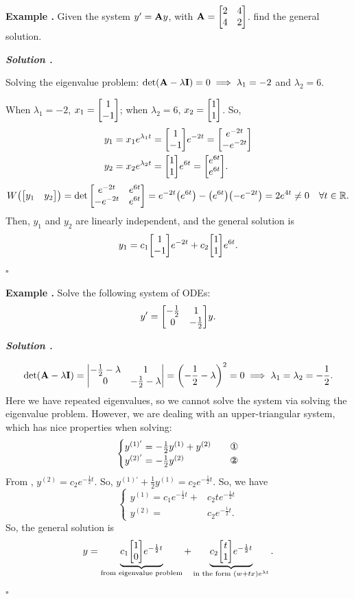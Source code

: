 \documentclass[12pt, a4paper]{article}
\newcounter{index}[subsection]
\newenvironment*{eg}{\begin{framed}\par\noindent\textbf{Example \thesubsection.\stepcounter{index}\theindex}}{\par\end{framed}}
\newcounter{nprf}[subsection]
\newenvironment*{sol}{\par\indent\textbf{\textit{Solution \stepcounter{nprf}\thenprf.}}\par}{\hfill{$\square$}\par}
\def\R{{\mathbb{R}}}
\def\A{\vb A}
\begin{document}
\begin{eg}
	Given the system $y'=\A y$, with $\A=\mqty[2&4\\4&2]$. find the general solution.
	\begin{sol}
		Solving the eigenvalue problem: $\det(\A-\lambda\vb I)=0\implies\lambda_1=-2$ and $\lambda_2=6$.\par When $\lambda_1=-2$, $x_1=\mqty[1\\-1]$; when $\lambda_2=6$, $x_2=\mqty[1\\1]$. So, \begin{align*}y_1&=x_1e^{\lambda_1t}=\mqty[1\\-1]e^{-2t}=\mqty[e^{-2t}\\-e^{-2t}]\\y_2&=x_2e^{\lambda_2t}=\mqty[1\\1]e^{6t}=\mqty[e^{6t}\\e^{6t}].\end{align*} \[W\qty(\mqty[y_1&y_2])=\det\mqty[e^{-2t}&e^{6t}\\-e^{-2t}&e^{6t}]=e^{-2t}\qty(e^{6t})-\qty(e^{6t})\qty(-e^{-2t})=2e^{4t}\neq0\quad\forall t\in\R.\] Then, $y_1$ and $y_2$ are linearly independent, and the general solution is \[y_1=c_1\mqty[1\\-1]e^{-2t}+c_2\mqty[1\\1]e^{6t}.\]
	\end{sol}
\end{eg}
\begin{eg}
	Solve the following system of ODEs: \[y'=\mqty[-\frac{1}{2}&1\\0&-\frac{1}{2}]y.\]
	\begin{sol}
		\[\det(\A-\lambda\vb I)=\mqty|-\frac{1}{2}-\lambda&1\\0&-\frac{1}{2}-\lambda|=\qty(-\dfrac{1}{2}-\lambda)^2=0\implies \lambda_1=\lambda_2=-\dfrac{1}{2}.\] Here we have repeated eigenvalues, so we cannot solve the system via solving the eigenvalue problem. However, we are dealing with an upper-triangular system, which has nice properties when solving: \[\begin{cases}y^{(1)'}=-\frac{1}{2}y^{(1)}+y^{(2)}\quad&\text{\ding{172}}\\y^{(2)'}=-\frac{1}{2}y^{(2)}\quad&\text{\ding{173}}\end{cases}\] From , $y^{(2)}=c_2e^{-\frac{1}{2}t}$. So, $y^{(1)'}+\frac{1}{2}y^{(1)}=c_2e^{-\frac{1}{2}t}$. So, we have \[\begin{cases}y^{(1)}=c_1e^{-\frac{1}{2}t}+&c_2te^{-\frac{1}{2}t}\\y^{(2)}=&c_2e^{-\frac{1}{2}t}.\end{cases}\] So, the general solution is \[y=\underbrace{c_1\mqty[1\\0]e^{-\frac{1}{2}t}}_\text{from eigenvalue problem}+\underbrace{c_2\mqty[t\\1]e^{-\frac{1}{2}t}}_{\text{in the form }\qty(w+tx)e^{\lambda t}}.\]
	\end{sol}
\end{eg}
\end{document}
